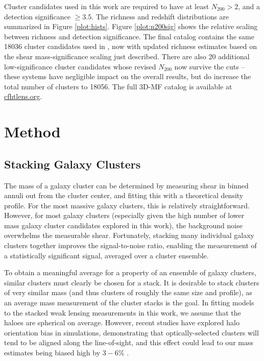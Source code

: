 Cluster candidates used in this work are required to have at least $N_{200} > 2$, and a detection significance $\ge 3.5$. The richness and redshift distributions are summarized in Figure \ref{plot:hists}. Figure \ref{plot:n200sig} shows the relative scaling between richness and detection significance. The final catalog contains the same 18036 cluster candidates used in \citet{Ford14}, now with updated richness estimates based on the shear mass-significance scaling just described. There are also 20 additional low-significance cluster candidates whose revised $N_{200}$ now survive the cuts -- these systems have negligible impact on the overall results, but do increase the total number of clusters to 18056. The full \ac{3D-MF} catalog is available at \url{cfhtlens.org}.  



\section{Method}
\label{method}

\subsection{Stacking Galaxy Clusters}

The mass of a galaxy cluster can be determined by measuring shear in binned annuli out from the cluster center, and fitting this with a theoretical density profile. For the most massive galaxy clusters, this is relatively straightforward. However, for most galaxy clusters (especially given the high number of lower mass galaxy cluster candidates explored in this work), the background noise overwhelms the measurable shear.  Fortunately, stacking many individual galaxy clusters together improves the signal-to-noise ratio, enabling the measurement of a statistically significant signal, averaged over a cluster ensemble.

To obtain a meaningful average for a property of an ensemble of galaxy clusters, similar clusters must clearly be chosen for a stack. It is desirable to stack clusters of very similar mass (and thus clusters of roughly the same size and profile), as an average mass measurement of the cluster stacks is the goal. In fitting models to the stacked weak lensing measurements in this work, we assume that the haloes are spherical on average. However, recent studies have explored halo orientation bias in simulations, demonstrating that optically-selected clusters will tend to be aligned along the line-of-sight, and this effect could lead to our mass estimates being biased high by $3-6$\% \citep{Dietrich14}.

